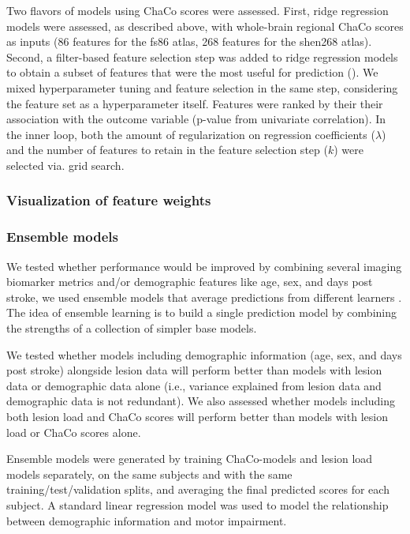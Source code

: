 \documentclass[10pt]{article}
\begin{document}
Two flavors of models using ChaCo scores were assessed. First, ridge regression models were assessed, as described above, with whole-brain regional ChaCo scores as inputs (86 features for the fs86 atlas, 268 features for the shen268 atlas). Second, a filter-based feature selection step was added to ridge regression models to obtain a subset of features that were the most useful for prediction (\cite{Hall1999-qr, Pudjihartono2022-zg}). We mixed hyperparameter tuning and feature selection in the same step, considering the feature set as a hyperparameter itself. Features were ranked by their their association with the outcome variable (p-value from univariate correlation). In the inner loop, both the amount of regularization on regression coefficients ($\lambda$) and the number of features to retain in the feature selection step ($k$) were selected via. grid search.

\subsubsection*{Visualization of feature weights}


\subsubsection*{Ensemble models}
We tested whether performance would be improved by combining several imaging biomarker metrics and/or demographic features like age, sex, and days post stroke, we used ensemble models that average predictions from different learners \cite{Hastie2001-or}. The idea of ensemble learning is to build a single prediction model by combining the strengths of a collection of simpler base models. 

We tested whether models including demographic information (age, sex, and days post stroke) alongside lesion data will perform better than models with lesion data or demographic data alone (i.e., variance explained from lesion data and demographic data is not redundant). We also assessed whether models including both lesion load and ChaCo scores will perform better than models with lesion load or ChaCo scores alone.

Ensemble models were generated by training ChaCo-models and lesion load models separately, on the same subjects and with the same training/test/validation splits, and averaging the final predicted scores for each subject. A standard linear regression model was used to model the relationship between demographic information and motor impairment. 
\end{document}
